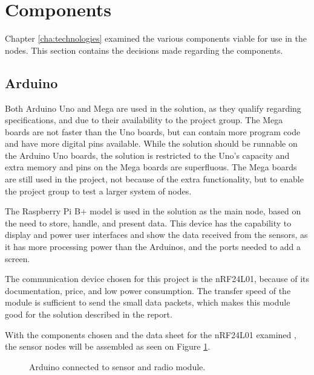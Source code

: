 \section{Components}
Chapter \ref{cha:technologies} examined the various components viable for use in the nodes. This section contains the decisions made regarding the components.

\subsection{Arduino}
Both Arduino Uno and Mega are used in the solution, as they qualify regarding specifications, and due to their availability to the project group. The Mega boards are not faster than the Uno boards, but can contain more program code and have more digital pins available. While the solution should be runnable on the Arduino Uno boards, the solution is restricted to the Uno's capacity and extra memory and pins on the Mega boards are superfluous. The Mega boards are still used in the project, not because of the extra functionality, but to enable the project group to test a larger system of nodes.

The Raspberry Pi B+ model is used in the solution as the main node, based on the need to store, handle, and present data. This device has the capability to display and power user interfaces and show the data received from the sensors, as it has more processing power than the Arduinos, and the ports needed to add a screen.

The communication device chosen for this project is the nRF24L01, because of its documentation, price, and low power consumption. The transfer speed of the module is sufficient to send the small data packets, which makes this module good for the solution described in the report.

With the components chosen and the data sheet for the nRF24L01 examined \cite{nf24datasheet}, the sensor nodes will be assembled as seen on Figure \ref{fig:compsketch}.

\begin{figure}[!h]
	\centering
	\caption{Arduino connected to sensor and radio module.}
	\label{fig:compsketch}
\end{figure}

